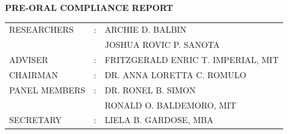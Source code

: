 \documentclass[12pt,letterpaper]{article}
\begin{document}
\begin{center}
  {\large\bfseries PRE-ORAL COMPLIANCE REPORT}
\end{center}

\vspace{0.4em}

\vspace{1em}
\begin{tabular}{@{}p{3.6cm}p{0.6cm}l@{}}
RESEARCHERS   & : & ARCHIE D. BALBIN \\
              &   & JOSHUA ROVIC P. SANOTA \\[0.8em]
ADVISER       & : & FRITZGERALD ENRIC T. IMPERIAL, MIT \\[0.8em]
CHAIRMAN      & : & DR. ANNA LORETTA C. ROMULO \\
PANEL MEMBERS & : & DR. RONEL B. SIMON \\
              &   & RONALD O. BALDEMORO, MIT \\[0.8em]
SECRETARY     & : & LIELA B. GARDOSE, MBA \\
\end{tabular}
\end{document}
